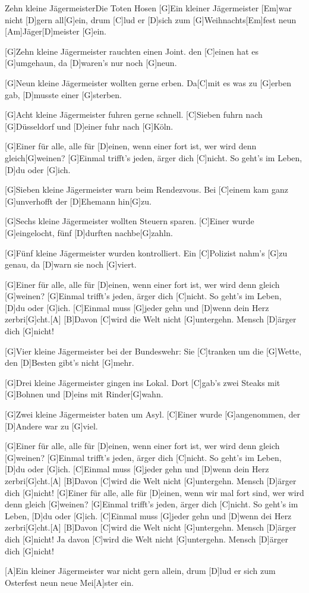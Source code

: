 \documentclass[../main.tex]{subfiles}
\begin{document}
\begin{song}{Zehn kleine Jägermeister}{Die Toten Hosen}{}
[G]Ein kleiner Jägermeister [Em]war nicht [D]gern all[G]ein, 
drum [C]lud er [D]sich zum [G]Weihnachts[Em]fest neun [Am]Jäger[D]meister [G]ein.

[G]Zehn kleine Jägermeister rauchten einen Joint. den [C]einen hat es [G]umgehaun, da [D]waren's nur noch [G]neun.

[G]Neun kleine Jägermeister wollten gerne erben. Da[C]mit es was zu [G]erben gab, [D]musste einer [G]sterben.

[G]Acht kleine Jägermeister fuhren gerne schnell. [C]Sieben fuhrn nach [G]Düsseldorf und [D]einer fuhr nach [G]Köln.

[G]Einer für alle, alle für [D]einen, wenn einer fort ist, wer wird denn gleich[G]weinen?
[G]Einmal trifft's jeden, ärger dich [C]nicht. So geht's im Leben, [D]du oder [G]ich.

[G]Sieben kleine Jägermeister warn beim Rendezvous. Bei [C]einem kam ganz [G]unverhofft der [D]Ehemann hin[G]zu.

[G]Sechs kleine Jägermeister wollten Steuern sparen. [C]Einer wurde [G]eingelocht, fünf [D]durften nachbe[G]zahln.

[G]Fünf kleine Jägermeister wurden kontrolliert. Ein [C]Polizist nahm's [G]zu genau, da [D]warn sie noch [G]viert.

[G]Einer für alle, alle für [D]einen, wenn einer fort ist, wer wird denn gleich [G]weinen?
[G]Einmal trifft's jeden, ärger dich [C]nicht. So geht's im Leben, [D]du oder [G]ich.
[C]Einmal muss [G]jeder gehn und [D]wenn dein Herz zerbri[G]cht.[A]{\hh}
[B]Davon [C]wird die Welt nicht [G]untergehn. Mensch [D]{ä}rger dich [G]nicht!

[G]Vier kleine Jägermeister bei der Bundeswehr: Sie [C]tranken um die [G]Wette, den [D]Besten gibt's nicht [G]mehr.

[G]Drei kleine Jägermeister gingen ins Lokal. Dort [C]gab's zwei Steaks mit [G]Bohnen und [D]eins mit Rinder[G]wahn.

[G]Zwei kleine Jägermeister baten um Asyl. [C]Einer wurde [G]angenommen, der [D]Andere war zu [G]viel.

[G]Einer für alle, alle für [D]einen, wenn einer fort ist, wer wird denn gleich [G]weinen?
[G]Einmal trifft's jeden, ärger dich [C]nicht. So geht's im Leben, [D]du oder [G]ich.
[C]Einmal muss [G]jeder gehn und [D]wenn dein Herz zerbri[G]cht.[A]{\hh}
[B]Davon [C]wird die Welt nicht [G]untergehn. Mensch [D]{ä}rger dich [G]nicht!
[G]Einer für alle, alle für [D]einen, wenn wir mal fort sind, wer wird denn gleich [G]weinen?
[G]Einmal trifft's jeden, ärger dich [C]nicht. So geht's im Leben, [D]du oder [G]ich.
[C]Einmal muss [G]jeder gehn und [D]wenn dei Herz zerbri[G]cht.[A]{\hh}
[B]Davon [C]wird die Welt nicht [G]untergehn. Mensch [D]{ä}rger dich [G]nicht!
Ja davon [C]wird die Welt nicht [G]untergehn. Mensch [D]{ä}rger dich [G]nicht!

[A]Ein kleiner Jägermeister war nicht gern allein, drum [D]lud er sich zum Osterfest neun neue Mei[A]ster ein.
\end{song}
\end{document}
